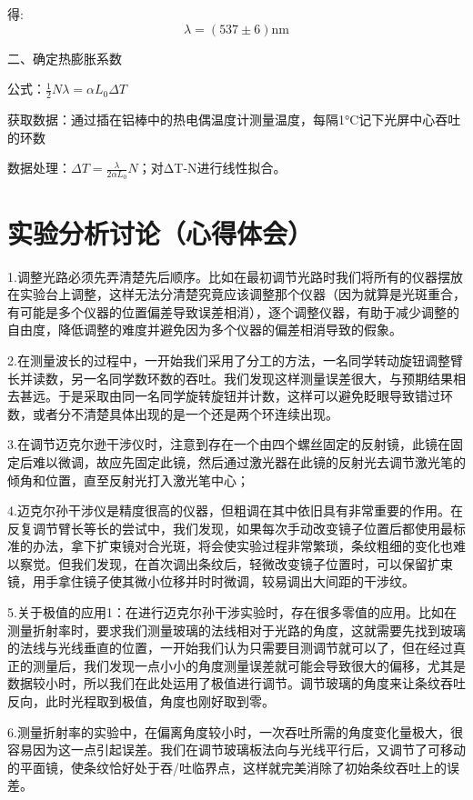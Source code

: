 \documentclass[10pt]{ctexart}
\begin{document}
得:\ 
\begin{equation*}
    \lambda = (537 \pm 6) \text{nm}
\end{equation*}

二、确定热膨胀系数

公式：$\frac{1}{2}N\lambda=\alpha L_0 \Delta T$

获取数据：通过插在铝棒中的热电偶温度计测量温度，每隔1°C记下光屏中心吞吐的环数

数据处理：$\Delta T = \frac{\lambda}{2\alpha L_0}N$；对ΔT-N进行线性拟合。

\newpage


\section{实验分析讨论（心得体会）}
1.调整光路必须先弄清楚先后顺序。比如在最初调节光路时我们将所有的仪器摆放在实验台上调整，这样无法分清楚究竟应该调整那个仪器（因为就算是光斑重合，有可能是多个仪器的位置偏差导致误差相消），逐个调整仪器，有助于减少调整的自由度，降低调整的难度并避免因为多个仪器的偏差相消导致的假象。

2.在测量波长的过程中，一开始我们采用了分工的方法，一名同学转动旋钮调整臂长并读数，另一名同学数环数的吞吐。我们发现这样测量误差很大，与预期结果相去甚远。于是采取由同一名同学旋转旋钮并计数，这样可以避免眨眼导致错过环数，或者分不清楚具体出现的是一个还是两个环连续出现。

3.在调节迈克尔逊干涉仪时，注意到存在一个由四个螺丝固定的反射镜，此镜在固定后难以微调，故应先固定此镜，然后通过激光器在此镜的反射光去调节激光笔的倾角和位置，直至反射光打入激光笔中心；

4.迈克尔孙干涉仪是精度很高的仪器，但粗调在其中依旧具有非常重要的作用。在反复调节臂长等长的尝试中，我们发现，如果每次手动改变镜子位置后都使用最标准的办法，拿下扩束镜对合光斑，将会使实验过程非常繁琐，条纹粗细的变化也难以察觉。但我们发现，在首次调出条纹后，轻微改变镜子位置时，可以保留扩束镜，用手拿住镜子使其微小位移并时时微调，较易调出大间距的干涉纹。

5.关于极值的应用1：在进行迈克尔孙干涉实验时，存在很多零值的应用。比如在测量折射率时，要求我们测量玻璃的法线相对于光路的角度，这就需要先找到玻璃的法线与光线垂直的位置，一开始我们认为只需要目测调节就可以了，但在经过真正的测量后，我们发现一点小小的角度测量误差就可能会导致很大的偏移，尤其是数据较小时，所以我们在此处运用了极值进行调节。调节玻璃的角度来让条纹吞吐反向，此时光程取到极值，角度也刚好取到零。

6.测量折射率的实验中，在偏离角度较小时，一次吞吐所需的角度变化量极大，很容易因为这一点引起误差。我们在调节玻璃板法向与光线平行后，又调节了可移动的平面镜，使条纹恰好处于吞/吐临界点，这样就完美消除了初始条纹吞吐上的误差。
\end{document}
